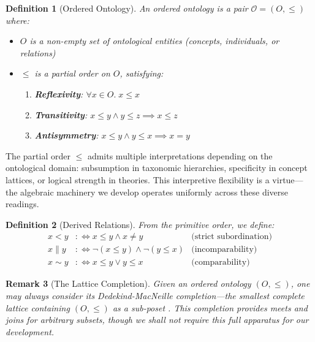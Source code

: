 \documentclass[12pt,a4paper]{article}
\newtheorem{definition}{Definition}[section]
\newtheorem{remark}[definition]{Remark}
\newcommand{\onto}{\mathcal{O}}
\begin{document}
\begin{definition}[Ordered Ontology]
An \emph{ordered ontology} is a pair $\onto = (O, \leq)$ where:
\begin{itemize}
    \item $O$ is a non-empty set of \emph{ontological entities} (concepts, individuals, or relations)
    \item $\leq$ is a partial order on $O$, satisfying:
    \begin{enumerate}[label=(\alph*)]
        \item \textbf{Reflexivity}: $\forall x \in O.\; x \leq x$
        \item \textbf{Transitivity}: $x \leq y \land y \leq z \implies x \leq z$
        \item \textbf{Antisymmetry}: $x \leq y \land y \leq x \implies x = y$
    \end{enumerate}
\end{itemize}
\end{definition}

The partial order $\leq$ admits multiple interpretations depending on the ontological domain: subsumption in taxonomic hierarchies, specificity in concept lattices, or logical strength in theories. This interpretive flexibility is a virtue---the algebraic machinery we develop operates uniformly across these diverse readings.

\begin{definition}[Derived Relations]
From the primitive order, we define:
\begin{align*}
    x < y &:\iff x \leq y \land x \neq y & \text{(strict subordination)}\\
    x \parallel y &:\iff \neg(x \leq y) \land \neg(y \leq x) & \text{(incomparability)}\\
    x \sim y &:\iff x \leq y \lor y \leq x & \text{(comparability)}
\end{align*}
\end{definition}

\begin{remark}[The Lattice Completion]
Given an ordered ontology $(O, \leq)$, one may always consider its Dedekind-MacNeille completion---the smallest complete lattice containing $(O, \leq)$ as a sub-poset \citep{davey2002}. This completion provides meets and joins for arbitrary subsets, though we shall not require this full apparatus for our development.
\end{remark}

\end{document}

